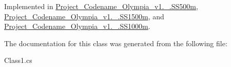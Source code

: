Implemented in \hyperlink{classProject__Codename__Olympia__v1_1_1__0_1_1SS500m_a1fc1ed5e2b6d1fa4d1921a3d155c6a6f}{Project\+\_\+\+Codename\+\_\+\+Olympia\+\_\+v1.\+\_.\+S\+S500m}, \hyperlink{classProject__Codename__Olympia__v1_1_1__0_1_1SS1500m_a70484e4f6b73c271756fa9bb6950eb0b}{Project\+\_\+\+Codename\+\_\+\+Olympia\+\_\+v1.\+\_.\+S\+S1500m}, and \hyperlink{classProject__Codename__Olympia__v1_1_1__0_1_1SS1000m_a4bfd83bce70e047370288c0b651e3e1c}{Project\+\_\+\+Codename\+\_\+\+Olympia\+\_\+v1.\+\_.\+S\+S1000m}.



The documentation for this class was generated from the following file\+:\begin{DoxyCompactItemize}
\item 
Class1.\+cs\end{DoxyCompactItemize}
